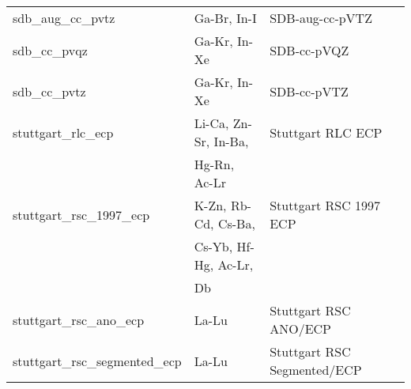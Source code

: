 \begin{longtable}{lll}
sdb\_aug\_cc\_pvtz & Ga-Br, In-I & SDB-aug-cc-pVTZ\\
sdb\_cc\_pvqz & Ga-Kr, In-Xe & SDB-cc-pVQZ\\
sdb\_cc\_pvtz & Ga-Kr, In-Xe & SDB-cc-pVTZ\\
stuttgart\_rlc\_ecp & Li-Ca, Zn-Sr, In-Ba, & Stuttgart RLC ECP\\
 & Hg-Rn, Ac-Lr & \\
stuttgart\_rsc\_1997\_ecp & K-Zn, Rb-Cd, Cs-Ba, & Stuttgart RSC 1997 ECP\\
                          & Cs-Yb, Hf-Hg, Ac-Lr, &\\
                          & Db & \\
stuttgart\_rsc\_ano\_ecp & La-Lu & Stuttgart RSC ANO/ECP\\
stuttgart\_rsc\_segmented\_ecp & La-Lu & Stuttgart RSC Segmented/ECP\\
\hline
\end{longtable}
